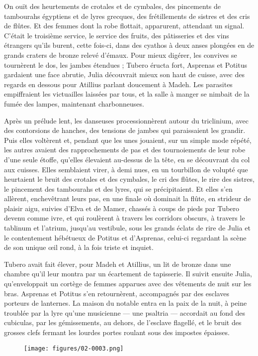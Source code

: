 \documentclass[a4paper, 11pt, oneside, polutonikogreek, french]{article}
\begin{document}
On ouït des heurtements de crotales et de cymbales, des pincements de tambourahs égyptiens et de lyres grecques, des frétillements de sistres et des cris de flûtes. Et des femmes dont la robe flottait, apparurent, attendant un signal. C'était le troisième service, le service des fruits, des pâtisseries et des vins étrangers qu'ils burent, cette fois-ci, dans des cyathos à deux anses plongées en de grands craters de bronze relevé d'émaux. Pour mieux digérer, les convives se tournèrent le dos, les jambes étendues ; Tubero éructa fort, Asprenas et Potitus gardaient une face abrutie, Julia découvrait mieux son haut de cuisse, avec des regards en dessous pour Atillius parlant doucement à Madeh. Les parasites empiffraient les victuailles laissées par tous, et la salle à manger se nimbait de la fumée des lampes, maintenant charbonneuses.

Après un prélude lent, les danseuses processionnèrent autour du triclinium, avec des contorsions de hanches, des tensions de jambes qui paraissaient les grandir. Puis elles voltèrent et, pendant que les unes jouaient, sur un simple mode répété, les autres avaient des rapprochements de pas et des tournoiements de leur robe d'une seule étoffe, qu'elles élevaient au-dessus de la tête, en se découvrant du col aux cuisses. Elles semblaient virer, à demi nues, en un tourbillon de volupté que heurtaient le bruit des crotales et des cymbales, le cri des flûtes, le rire des sistres, le pincement des tambourahs et des lyres, qui se précipitaient. Et elles s'en allèrent, enchevêtrant leurs pas, en une finale où dominait la flûte, en strideur de plaisir aigu, suivies d'Elva et de Mamer, chassés à coups de pieds par Tubero devenu comme ivre, et qui roulèrent à travers les corridors obscurs, à travers le tablinum et l'atrium, jusqu'au vestibule, sous les grands éclats de rire de Julia et le contentement hébétueux de Potitus et d'Asprenas, celui-ci regardant la scène de son unique œil rond, à la fois triste et inquiet.

Tubero avait fait élever, pour Madeh et Atillius, un lit de bronze dans une chambre qu'il leur montra par un écartement de tapisserie. Il suivit ensuite Julia, qu'enveloppait un cortège de femmes apparues avec des vêtements de nuit sur les bras. Asprenas et Potitus s'en retournèrent, accompagnés par des esclaves porteurs de lanternes. La maison du notable entra en la paix de la nuit, à peine troublée par la lyre qu'une musicienne --- une psaltria --- accordait au fond des cubiculas, par les gémissements, au dehors, de l'esclave flagellé, et le bruit des grosses clefs fermant les lourdes portes roulant sous des impostes épaisses.
\begin{figure}[H]
\centering
\texttt{[image: figures/02-0003.png]}
\end{figure}
\clearpage
\end{document}
